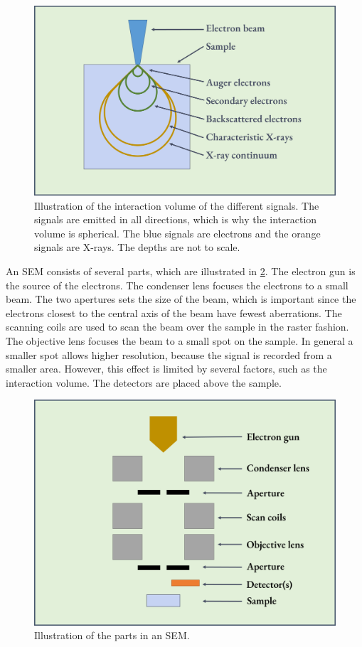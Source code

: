 \begin{figure}[ht]
    \centering
    \includegraphics[width=0.8\linewidth]{figures/interaction_volume.png}
    \caption{
        Illustration of the interaction volume of the different signals.
        The signals are emitted in all directions, which is why the interaction volume is spherical.
        The blue signals are electrons and the orange signals are X-rays.
        The depths are not to scale.
    }
    \label{fig:interaction_volume}
\end{figure}




An SEM consists of several parts, which are illustrated in \cref{fig:SEM_setup}.
The electron gun is the source of the electrons.
The condenser lens focuses the electrons to a small beam.
The two apertures sets the size of the beam, which is important since the electrons closest to the central axis of the beam have fewest aberrations.
The scanning coils are used to scan the beam over the sample in the raster fashion.
The objective lens focuses the beam to a small spot on the sample.
In general a smaller spot allows higher resolution, because the signal is recorded from a smaller area.
However, this effect is limited by several factors, such as the interaction volume.
The detectors are placed above the sample.


\begin{figure}[ht]
    \centering
    \includegraphics[width=0.8\linewidth]{figures/SEM_setup.png}
    \caption{
        Illustration of the parts in an SEM.
    }
    \label{fig:SEM_setup}
\end{figure}